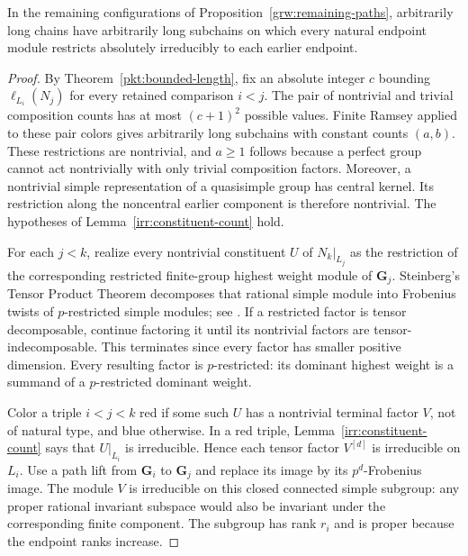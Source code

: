 \begin{proposition}
\label{irr:natural-endpoints}
In the remaining configurations of Proposition~\ref{grw:remaining-paths},
arbitrarily long chains have arbitrarily long subchains on which every
natural endpoint module restricts absolutely irreducibly to each earlier
endpoint.
\end{proposition}

\begin{proof}
By Theorem~\ref{pkt:bounded-length}, fix an absolute integer $c$ bounding
$\ell_{L_i}(N_j)$ for every retained comparison $i<j$.
The pair of nontrivial and trivial composition counts has at most
$(c+1)^2$ possible values.  Finite Ramsey applied to these pair colors
gives arbitrarily long subchains with constant counts $(a,b)$.
These restrictions are nontrivial, and $a\geq1$ follows because a perfect
group cannot act nontrivially with only trivial composition factors.
Moreover, a nontrivial simple representation of a quasisimple group has
central kernel.  Its restriction along the noncentral earlier component
is therefore nontrivial.  The hypotheses of
Lemma~\ref{irr:constituent-count} hold.

For each $j<k$, realize every nontrivial constituent $U$ of $N_k|_{L_j}$
as the restriction of the corresponding restricted finite-group highest
weight module of $\mathbf G_j$.  Steinberg's Tensor Product Theorem
decomposes that rational simple module into Frobenius twists of
$p$-restricted simple modules; see \cite[Theorem~41]{SteinbergNotes}.
If a restricted factor is tensor decomposable, continue factoring it
until its nontrivial factors are tensor-indecomposable.
This terminates since every factor has smaller positive dimension.
Every resulting factor is $p$-restricted: its dominant highest weight
is a summand of a $p$-restricted dominant weight.

Color a triple $i<j<k$ red if some such $U$ has a nontrivial terminal
factor $V$, not of natural type, and blue otherwise.  In a red triple,
Lemma~\ref{irr:constituent-count} says that $U|_{L_i}$ is irreducible.
Hence each tensor factor $V^{[d]}$ is irreducible on $L_i$.
Use a path lift from $\mathbf G_i$ to $\mathbf G_j$ and replace its image
by its $p^d$-Frobenius image.  The module $V$ is irreducible on this closed
connected simple subgroup: any proper rational invariant subspace would
also be invariant under the corresponding finite component.  The subgroup
has rank $r_i$ and is proper because the endpoint ranks increase.


\end{proof}
